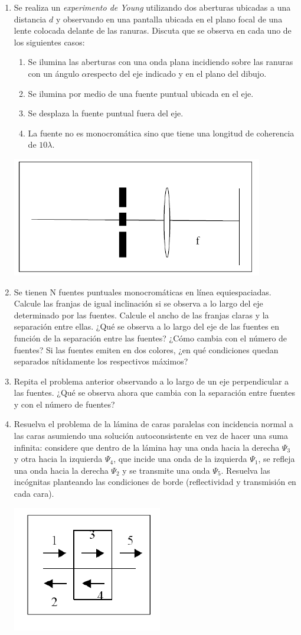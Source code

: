 \documentclass[11pt,spanish,a4paper]{article}
\begin{document}
\begin{enumerate}
\item Se realiza un \textit{experimento de Young} utilizando dos aberturas ubicadas a una distancia \(d \) y observando en una pantalla ubicada en el plano focal de una lente colocada delante de las ranuras.
	Discuta que se observa en cada uno de los siguientes casos:
	\begin{enumerate}
		\item Se ilumina las aberturas con una onda plana incidiendo sobre las ranuras con un ángulo \( \alpha \)respecto del eje indicado y en el plano del dibujo.
		\item Se ilumina por medio de una fuente puntual ubicada en el eje.
		\item Se desplaza la fuente puntual fuera del eje.
		\item La fuente no es monocromática sino que tiene una longitud de coherencia de \( 10 \lambda \).
	\end{enumerate}
	\begin{center}
		\includegraphics[width=0.25\linewidth]{g09e09}
	\end{center}

	
\item \label{Nfuentes} Se tienen N fuentes puntuales monocromáticas en línea equiespaciadas.
	Calcule las	franjas de igual inclinación si se observa a lo largo del eje determinado por las fuentes.
	Calcule el ancho de las franjas claras y la separación entre ellas.
	¿Qué se observa a lo largo del eje de las fuentes en función de la separación entre las fuentes?
	¿Cómo cambia con el número de fuentes?
	Si las fuentes emiten en dos colores, ¿en qué condiciones quedan separados nítidamente los respectivos máximos?


\item Repita el problema anterior observando a lo largo de un eje perpendicular a las fuentes.
	¿Qué se observa ahora que cambia con la separación entre fuentes y con el número de fuentes?


\item  Resuelva el problema de la lámina de caras paralelas con incidencia normal a las caras asumiendo una solución autoconsistente en vez de hacer una suma infinita: considere que dentro de la lámina hay una onda hacia la derecha \( \Psi_3 \) y otra hacia la izquierda \( \Psi_4 \), que incide una onda de la izquierda \( \Psi_1 \), se refleja una onda hacia la derecha \( \Psi_2 \) y se transmite una onda \( \Psi_5 \).
	Resuelva las incógnitas planteando las condiciones de borde (reflectividad y transmisión en cada cara).
	\begin{center}
		\includegraphics[width=0.15\linewidth]{g09e13}
	\end{center}



\end{enumerate}
\end{document}
